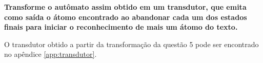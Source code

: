 
\textbf{Transforme o autômato assim obtido em um transdutor, que emita como saída o átomo encontrado ao abandonar cada um dos estados finais para iniciar o reconhecimento de mais um átomo do texto.}

O transdutor obtido a partir da transformação da questão 5 pode ser encontrado no apêndice \ref{app:transdutor}.
